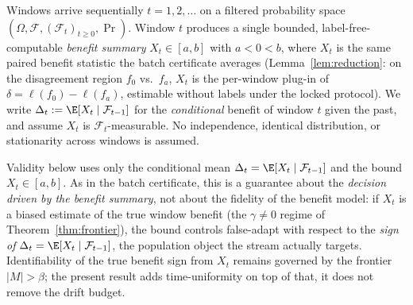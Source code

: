 %

\begin{assumption}\label{asm:stream}
Windows arrive sequentially $t=1,2,\dots$ on a filtered probability space
$(\Omega,\mathcal F,(\mathcal F_t)_{t\ge0},\Pr)$. Window $t$ produces a single
bounded, label-free-computable \emph{benefit summary}
$X_t\in[a,b]$ with $a<0<b$, where $X_t$ is the same paired benefit statistic the
batch certificate averages (Lemma~\ref{lem:reduction}: on the disagreement
region $f_0$ vs.\ $f_a$, $X_t$ is the per-window plug-in of $\delta=\ell(f_0)-\ell(f_a)$,
estimable without labels under the locked protocol). We write
$\Delta_t:=\E[X_t\mid\mathcal F_{t-1}]$ for the \emph{conditional} benefit of
window $t$ given the past, and assume $X_t$ is $\mathcal F_t$-measurable. No
independence, identical distribution, or stationarity across windows is assumed.
\end{assumption}

\begin{remark}\label{rmk:Xt}
Validity below uses only the conditional mean $\Delta_t=\E[X_t\mid\mathcal F_{t-1}]$ and
the bound $X_t\in[a,b]$. As in the batch certificate, this is a guarantee about
the \emph{decision driven by the benefit summary}, not about the fidelity of the
benefit model: if $X_t$ is a biased estimate of the true window benefit (the
$\gamma\neq0$ regime of Theorem~\ref{thm:frontier}), the bound controls
false-adapt with respect to the \emph{sign of $\Delta_t=\E[X_t\mid\mathcal F_{t-1}]$},
the population object the stream actually targets. Identifiability of the true
benefit sign from $X_t$ remains governed by the frontier $|M|>\beta$; the present
result adds time-uniformity on top of that, it does not remove the drift budget.
\end{remark}

